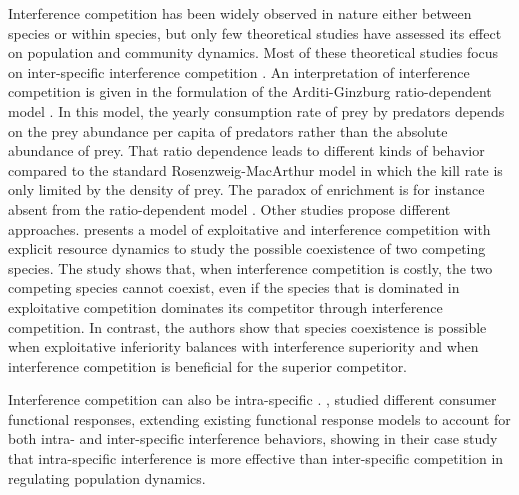 Interference competition has been widely observed in nature either between
species or within species, but only few theoretical studies have assessed its
effect on population and community dynamics. Most of these theoretical studies
focus on inter-specific interference competition
\autocites{case1974a,carothers1984a,vance1984a,adler2000a}. An interpretation of
interference competition is given in the formulation of the Arditi-Ginzburg
ratio-dependent model \autocites{arditi1989a,arditi1991a,arditi2012a}. In this
model, the yearly consumption rate of prey by predators depends on the prey
abundance per capita of predators rather than the absolute abundance of prey.
That ratio dependence leads to different kinds of behavior compared to the
standard Rosenzweig-MacArthur model in which the kill rate is only limited by
the density of prey. The paradox of enrichment is for instance absent from the
ratio-dependent model \autocites{arditi2012a}. Other studies propose different
approaches. \textcite{amarasekare2002a} presents a model of exploitative and
interference competition with explicit resource dynamics to study the possible
coexistence of two competing species. The study shows that, when interference
competition is costly, the two competing species cannot coexist, even if the
species that is dominated in exploitative competition dominates its competitor
through interference competition. In contrast, the authors show that species
coexistence is possible when exploitative inferiority balances with interference
superiority and when interference competition is beneficial for the superior
competitor.

Interference competition can also be intra-specific
\autocites{walde1984a,crowley1987a,maddonni2004a,smallegange2006a}.
\textcite{de-villemereuil2011a}, studied different consumer functional
responses, extending existing functional response models to account for both
intra- and inter-specific interference behaviors, showing in their case study
that intra-specific interference is more effective than inter-specific
competition in regulating population dynamics.

